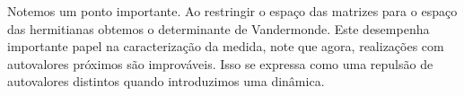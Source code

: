 Notemos um ponto importante. Ao restringir o espaço das matrizes para o espaço das hermitianas obtemos o determinante de Vandermonde. Este desempenha importante papel na caracterização da medida, note que agora, realizações com autovalores próximos são improváveis. Isso se expressa como uma repulsão de autovalores distintos quando introduzimos uma dinâmica.